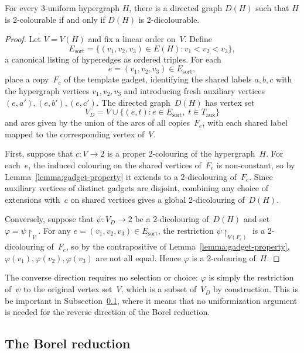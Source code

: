 \begin{lemma}\label{lem:classical}
For every 3-uniform hypergraph $H$, there is a directed graph $D(H)$ such that $H$ is 2-colourable if and only if $D(H)$ is 2-dicolourable.
\end{lemma}

\begin{proof}
Let $V = V(H)$ and fix a linear order on~$V$.
Define $$E_{\mathrm{sort}} = \bigl\{(v_1,v_2,v_3)\in E(H) : v_1 < v_2 < v_3\bigr\},$$
a canonical listing of hyperedges as ordered triples.
For each $$e=(v_1,v_2,v_3)\in E_{\mathrm{sort}},$$ place a copy~$F_e$ of the template gadget, identifying the shared labels $a,b,c$ with the hypergraph vertices $v_1,v_2,v_3$ and introducing fresh auxiliary vertices $(e,a'),(e,b'),(e,c')$.
The directed graph~$D(H)$ has vertex set $$V_D = V \cup \bigl\{(e,t) : e\in E_{\mathrm{sort}},\; t\in T_{\mathrm{aux}}\bigr\}$$
and arcs given by the union of the arcs of all copies~$F_e$, with each shared label mapped to the corresponding vertex of~$V$.

First, suppose that $c\colon V\to 2$ is a proper 2-colouring of the hypergraph~$H$.
For each~$e$, the induced colouring on the shared vertices of~$F_e$ is non-constant, so by Lemma~\ref{lemma:gadget-property} it extends to a 2-dicolouring of~$F_e$.
Since auxiliary vertices of distinct gadgets are disjoint, combining any choice of extensions with~$c$ on shared vertices gives a global 2-dicolouring of~$D(H)$.

Conversely, suppose that $\psi\colon V_D\to 2$ be a 2-dicolouring of~$D(H)$ and set $\varphi = \psi\restriction_V$.
For any $e = (v_1,v_2,v_3)\in E_{\mathrm{sort}}$, the restriction $\psi\restriction_{V(F_e)}$ is a 2-dicolouring of~$F_e$, so by the contrapositive of Lemma~\ref{lemma:gadget-property}, $\varphi(v_1),\varphi(v_2),\varphi(v_3)$ are not all equal.
Hence $\varphi$ is a 2-colouring of~$H$.
\end{proof}

\begin{remark}\label{rmk:reverse-simple}
The converse direction requires no selection or choice: $\varphi$ is simply the restriction of~$\psi$ to the original vertex set~$V$, which is a subset of~$V_D$ by construction.
This is be important in Subsection~\ref{sec:borel}, where it means that no uniformization argument is needed for the reverse direction of the Borel reduction.
\end{remark}

\subsection{The Borel reduction}\label{sec:borel}

